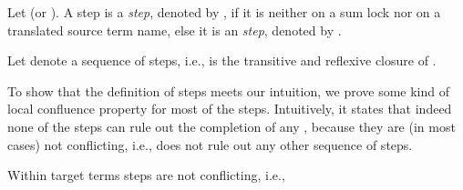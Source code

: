 \documentclass[]{llncs}
\begin{document}
\begin{definition} \label{def:pureImpureAdminStep}
	Let  (or ). A step  is a \emph{\pure \admin step}, denoted by , if it is neither on a sum lock nor on a translated source term name, else it is an \emph{\impure \admin step}, denoted by .
	
	Let  denote a sequence of \pure \admin steps, i.e.,  is the transitive and reflexive closure of .
\end{definition}

To show that the definition of \pure \admin steps meets our intuition, we prove some kind of local confluence property for most of the \pure \admin steps. Intuitively, it states that indeed none of the \pure \admin steps can rule out the completion of any \simulation, because they are (in most cases) not conflicting, i.e., does not rule out any other sequence of steps.

\begin{lemma} \label{lem:nonConflictingStepsSepAsyn}
	Within target terms \pure \admin steps are not conflicting, i.e.,
	
\end{lemma}
\end{document}
